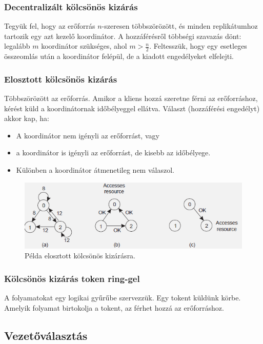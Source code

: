 \documentclass[margin=0px]{article}
\begin{document}
\subsubsection{Decentralizált kölcsönös kizárás}

Tegyük fel, hogy az erőforrás $n$-szeresen többszörözött, és minden replikátumhoz tartozik egy azt kezelő
koordinátor. A hozzáférésről többségi szavazás dönt: legalább $m$ koordinátor szükséges, ahol $m>\frac{n}{2}$.
Feltesszük, hogy egy esetleges összeomlás után a koordinátor felépül, de a kiadott engedélyeket
elfelejti.

\subsubsection{Elosztott kölcsönös kizárás}

Többszörözött az erőforrás. Amikor a kliens hozzá szeretne férni az erőforráshoz, kérést küld a koordinátornak
időbélyeggel ellátva. Választ (hozzáférési engedélyt) akkor kap, ha:

\begin{itemize}
    \item	A koordinátor nem igényli az erőforrást, vagy
    \item	a koordinátor is igényli az erőforrást, de kisebb az időbélyege.
    \item	Különben a koordinátor átmenetileg nem válaszol.
\end{itemize}

\begin{figure}[H]
    \centering
    \includegraphics[width=0.6\linewidth]{img/kolcskizar_elosztott}
    \caption{Példa elosztott kölcsönös kizárásra.}
    \label{fig:kolcskizar_elosztott}
\end{figure}

\subsubsection{Kölcsönös kizárás token ring-gel}

A folyamatokat egy logikai gyűrűbe szervezzük. Egy tokent küldünk körbe. Amelyik folyamat birtokolja a tokent, az
férhet hozzá az erőforráshoz.

\subsection{Vezetőválasztás}
\end{document}

